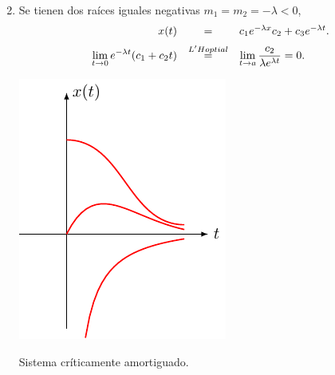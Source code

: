 \documentclass{beamer}
\begin{document}
\begin{frame}[t]
	\begin{block}{}
		\begin{enumerate}
			\setcounter{enumi}{1}
			\item {} Se tienen dos raíces iguales negativas \(m_1=m_2 = -\lambda <0\),
				\[
					\begin{array}{rcl}
						x(t) & = & c_1e^{- \lambda x} c_2+c_3e^{- \lambda t}. \\[2mm]
						\displaystyle\lim_{t\rightarrow 0} e^{- \lambda t} (c_1+c_2t) & \stackrel{L'Hoptial}{=}  & \displaystyle\lim_{t\rightarrow a} \dfrac{c_2}{\lambda e^{\lambda t}} =0.
					\end{array}
				\]
				\begin{minipage}{0.5\linewidth}
					\includegraphics[width= 0.8 \linewidth]{IMAGENES/4/tikz.pdf}
				\end{minipage}
				\begin{minipage}{0.4\linewidth}
					Sistema críticamente amortiguado.
				\end{minipage}
		\end{enumerate}
	\end{block}
\end{frame}
\end{document}
